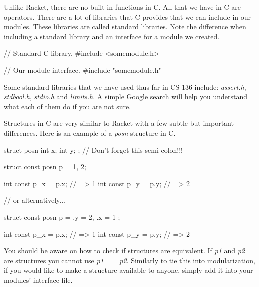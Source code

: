 Unlike Racket, there are no built in functions in C. All that we have in C are operators. There are a lot of libraries that C provides that we can include in our modules. These libraries are called standard libraries. Note the difference when including a standard library and an interface for a module we created.\\

\begin{code}[C]
// Standard C library.
#include <somemodule.h>

// Our module interface.
#include "somemodule.h"
\end{code}

Some standard libraries that we have used thus far in CS 136 include: \emph{assert.h}, \emph{stdbool.h}, \emph{stdio.h} and \emph{limits.h}. A simple Google search will help you understand what each of them do if you are not sure.\\



Structures in C are very similar to Racket with a few subtle but important differences. Here is an example of a \emph{posn} structure in C.\\


\begin{code}[C]
struct posn {
	int x;
	int y;
}; // Don't forget this semi-colon!!!

struct const posn p = {1, 2};

int const p_x = p.x; // => 1
int const p_y = p.y; // => 2

// or alternatively...

struct const posn p = { .y = 2, .x = 1 };

int const p_x = p.x; // => 1
int const p_y = p.y; // => 2
\end{code}

You should be aware on how to check if structures are equivalent. If \emph{p1} and \emph{p2} are structures you cannot use \emph{p1 == p2}. Similarly to tie this into modularization, if you would like to make a structure available to anyone, simply add it into your modules' interface file.\\


